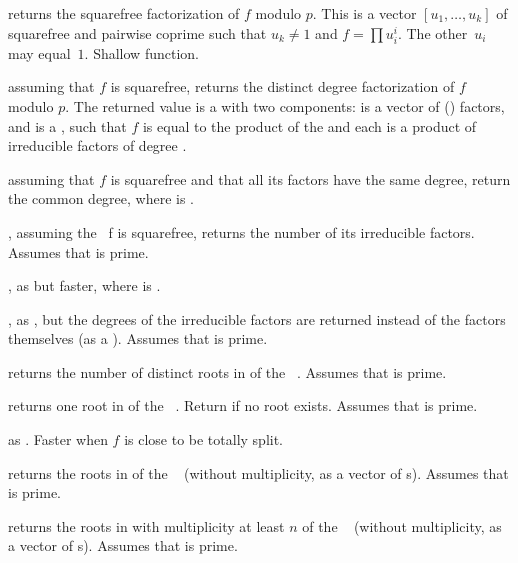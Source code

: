  returns the squarefree
factorization of $f$ modulo $p$. This is a vector $[u_1,\dots,u_k]$
of squarefree and pairwise coprime  such that $u_k \neq 1$ and $f =
\prod u_i^i$. The other~$u_i$ may equal~$1$.
Shallow function.

 assuming that $f$ is squarefree,
returns the distinct degree factorization of $f$ modulo $p$.
The returned value  is a  with two
components:  is a vector of ()
factors, and  is a , such that
$f$ is equal to the product of the  and each 
is a product of irreducible factors of degree .

 assuming that $f$ is squarefree
and that all its factors have the same degree, return the common degree,
where  is .

, assuming the ~f is squarefree,
returns the number of its irreducible factors. Assumes that  is prime.

, as
 but faster,
where  is .

, as , but the
degrees of the irreducible factors are returned instead of the factors
themselves (as a ). Assumes that  is prime.

 returns the number of distinct
roots in  of the ~. Assumes that  is prime.

 returns one root in  of
the ~. Return  if no root exists.
Assumes that  is prime.

 as .
Faster when $f$ is close to be totally split.

 returns the roots in  of
the ~ (without multiplicity, as a vector of s).
Assumes that  is prime.

returns the roots in  with multiplicity at least $n$ of
the ~ (without multiplicity, as a vector of s).
Assumes that  is prime.

